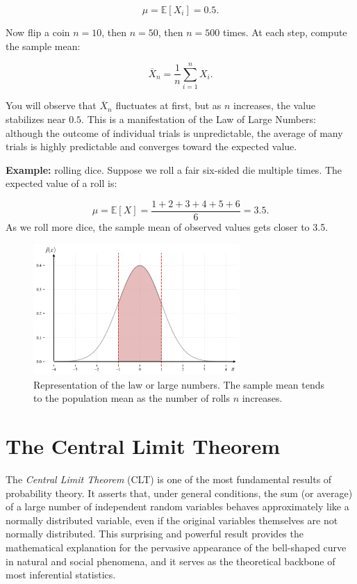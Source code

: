 \documentclass{book}
\begin{document}
\[
	\mu = \mathbb{E}[X_i] = 0.5.
\]

Now flip a coin \( n = 10 \), then \( n = 50 \), then \( n = 500 \) times. At each step, compute the sample mean:

\[
	\overline{X}_n = \frac{1}{n} \sum_{i=1}^n X_i.
\]

You will observe that \( \overline{X}_n \) fluctuates at first, but as \( n \) increases, the value stabilizes near \( 0.5 \). This is a manifestation of the Law of Large Numbers: although the outcome of individual trials is unpredictable, the average of many trials is highly predictable and converges toward the expected value.

\textbf{Example:} rolling dice. Suppose we roll a fair six-sided die multiple times. The expected value of a roll is:

\[
    \mu = \mathbb{E}[X] = \frac{1+2+3+4+5+6}{6} = 3.5.
\]
As we roll more dice, the sample mean of observed values gets closer to 3.5. 

\begin{figure}[ht]
    \centering
    \includegraphics[width=0.7\textwidth]{figures/chapter2/gaussian_2.png}
    \caption{Representation of the law or large numbers. The sample mean tends to the population mean as the number of rolls $n$ increases.}
    \label{fig:random}
\end{figure}

\newpage

\section{The Central Limit Theorem}

The \textit{Central Limit Theorem} (CLT) is one of the most fundamental results of probability theory. It asserts that, under general conditions, the sum (or average) of a large number of independent random variables behaves approximately like a normally distributed variable, even if the original variables themselves are not normally distributed. This surprising and powerful result provides the mathematical explanation for the pervasive appearance of the bell-shaped curve in natural and social phenomena, and it serves as the theoretical backbone of most inferential statistics.
\end{document}
